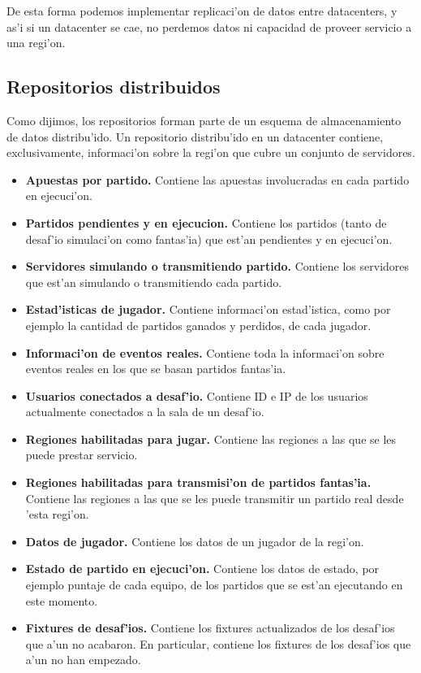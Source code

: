 \noindent
De esta forma podemos implementar replicaci'on de datos entre datacenters, y as'i si un datacenter se cae, no perdemos datos ni capacidad de proveer servicio a una regi'on.

\subsection{Repositorios distribuidos}

Como dijimos, los repositorios forman parte de un esquema de almacenamiento de datos distribu'ido. Un repositorio distribu'ido en un datacenter contiene, exclusivamente, informaci'on sobre la regi'on que cubre un conjunto de servidores.

\begin{itemize}
	\item \textbf{Apuestas por partido.} Contiene las apuestas involucradas en cada partido en ejecuci'on.
	\item \textbf{Partidos pendientes y en ejecucion.} Contiene los partidos (tanto de desaf'io simulaci'on como fantas'ia) que est'an pendientes y en ejecuci'on.
	\item \textbf{Servidores simulando o transmitiendo partido.} Contiene los servidores que est'an simulando o transmitiendo cada partido.
	\item \textbf{Estad'isticas de jugador.} Contiene informaci'on estad'istica, como por ejemplo la cantidad de partidos ganados y perdidos, de cada jugador.
	\item \textbf{Informaci'on de eventos reales.} Contiene toda la informaci'on sobre eventos reales en los que se basan partidos fantas'ia.
	\item \textbf{Usuarios conectados a desaf'io.} Contiene ID e IP de los usuarios actualmente conectados a la sala de un desaf'io.
	\item \textbf{Regiones habilitadas para jugar.} Contiene las regiones a las que se les puede prestar servicio.
	\item \textbf{Regiones habilitadas para transmisi'on de partidos fantas'ia.} Contiene las regiones a las que se les puede transmitir un partido real desde 'esta regi'on.
	\item \textbf{Datos de jugador.} Contiene los datos de un jugador de la regi'on.
	\item \textbf{Estado de partido en ejecuci'on.} Contiene los datos de estado, por ejemplo puntaje de cada equipo, de los partidos que se est'an ejecutando en este momento.
	\item \textbf{Fixtures de desaf'ios.} Contiene los fixtures actualizados de los desaf'ios que a'un no acabaron. En particular, contiene los fixtures de los desaf'ios que a'un no han empezado.

\end{itemize}
